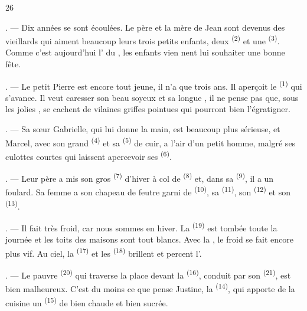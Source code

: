 \begin{VUpage}[28]{26}
\VUsaut{4.0mm}
\VUsaut{1.6mm}
\VUsaut{3.0mm}

. --- Dix années se sont écoulées. Le père et la\nl
mère de Jean sont devenus des vieillards qui aiment\nl
beaucoup leurs trois petits enfants, deux \cc
{} \textsuperscript{(2)} et une  \textsuperscript{(3)}. Comme c'est aujourd'hui\nl
l' du , les enfants vien\cc
nent lui souhaiter une bonne fête.

. --- Le petit Pierre est encore tout jeune, il n'a que\nl
trois ans. Il aperçoit le  \textsuperscript{(1)} qui s'avance. Il\nl
veut caresser son beau  soyeux et sa longue\nl
{}, il ne pense pas que, sous les jolies ,\nl
se cachent de vilaines griffes pointues qui pourront\nl
bien l'égratigner.

. --- Sa sœur Gabrielle, qui lui donne la main, est\nl
beaucoup plus sérieuse, et Marcel, avec son grand\nl
{} \textsuperscript{(4)} et sa  \textsuperscript{(5)} de cuir, a l'air d'un\nl
petit homme, malgré ses culottes courtes qui laissent\nl
apercevoir ses  \textsuperscript{(6)}.

. --- Leur père a mis son gros  \textsuperscript{(7)}\nl
d'hiver à col de  \textsuperscript{(8)} et, dans sa  \textsuperscript{(9)}, il\nl
a un foulard. Sa femme a son chapeau de feutre\nl
garni de  \textsuperscript{(10)}, sa  \textsuperscript{(11)}, son  \textsuperscript{(12)} et\nl
son  \textsuperscript{(13)}.

. --- Il fait très froid, car nous sommes en hiver.\nl
La  \textsuperscript{(19)} est tombée toute la journée et les toits\nl
des maisons sont tout blancs. Avec la , le\nl
froid se fait encore plus vif. Au ciel, la  \textsuperscript{(17)} et\nl
les  \textsuperscript{(18)} brillent et percent l'.

. --- Le pauvre  \textsuperscript{(20)} qui traverse la place\nl
devant la  \textsuperscript{(16)}, conduit par son  \textsuperscript{(21)},\nl
est bien malheureux. C'est du moins ce que pense\nl
Justine, la  \textsuperscript{(14)}, qui apporte de la cuisine un\nl
{} \textsuperscript{(15)} de  bien chaude et bien sucrée.
\end{VUpage}

